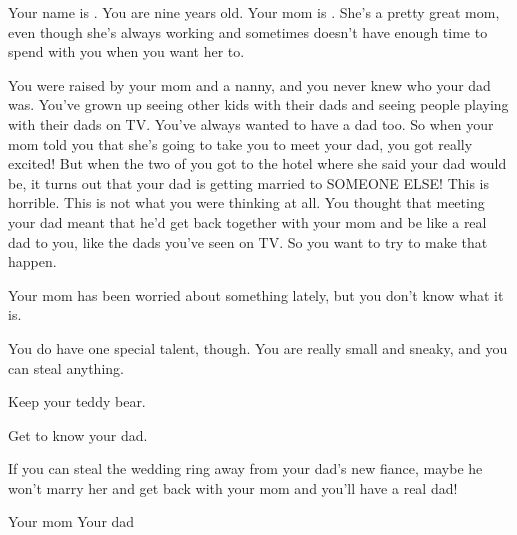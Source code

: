 \documentclass[char]{guildcamp1}
\begin{document}
\name{\cKid{}}

Your name is \cKid{}. You are nine years old. Your mom is \cScientist{}. She's a pretty great mom, even though she's always working and sometimes doesn't have enough time to spend with you when you want her to. 

You were raised by your mom and a nanny, and you never knew who your dad was. You've grown up seeing other kids with their dads and seeing people playing with their dads on TV. You've always wanted to have a dad too. So when your mom told you that she's going to take you to meet your dad, you got really excited! But when the two of you got to the hotel where she said your dad would be, it turns out that your dad is getting married to SOMEONE ELSE! This is horrible. This is not what you were thinking at all. You thought that meeting your dad meant that he'd get back together with your mom and be like a real dad to you, like the dads you've seen on TV. So you want to try to make that happen. 

Your mom has been worried about something lately, but you don't know what it is. 

You do have one special talent, though. You are really small and sneaky, and you can steal anything. 

\begin{itemz}[Goals]
  \item Keep your teddy bear.
  \item Get to know your dad. 
  \item If you can steal the wedding ring away from your dad's new fiance, maybe he won't marry her and get back with your mom and you'll have a real dad!
\end{itemz}


\begin{contacts}
  \contact{\cScientist{}} Your mom 
  \contact{\cGroomA{\MYname}} Your dad
\end{contacts}
\end{document}
